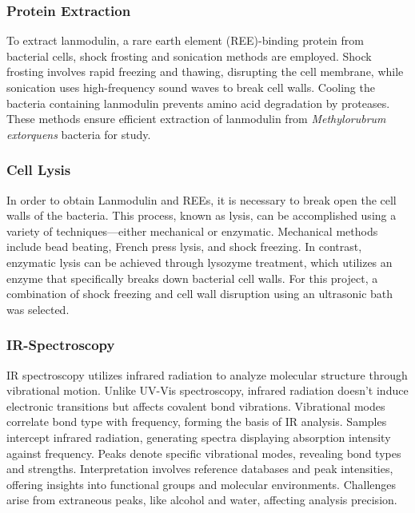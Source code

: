 \subsubsection{Protein Extraction\authorB{}}
To extract lanmodulin, a rare earth element (REE)-binding protein from bacterial cells, shock frosting and sonication methods are employed.
Shock frosting involves rapid freezing and thawing, disrupting the cell membrane, while sonication uses high-frequency sound waves to break cell walls.
Cooling the bacteria containing lanmodulin prevents amino acid degradation by proteases.
These methods ensure efficient extraction of lanmodulin from \emph{Methylorubrum extorquens} bacteria for study.

\subsubsection{Cell Lysis\authorB{}}
In order to obtain Lanmodulin and REEs, it is necessary to break open the cell walls of the
bacteria.
This process, known as lysis, can be accomplished using a variety of techniques—either mechanical or enzymatic.
Mechanical methods include bead beating, French press lysis, and shock freezing.
In contrast, enzymatic lysis can be achieved through lysozyme treatment, which utilizes an enzyme that specifically breaks down bacterial cell walls.
For this project, a combination of shock freezing and cell wall disruption using an ultrasonic bath was selected.

\subsubsection{IR-Spectroscopy\authorB}
IR spectroscopy utilizes infrared radiation to analyze molecular structure through vibrational motion.
Unlike UV-Vis spectroscopy, infrared radiation doesn't induce electronic transitions but
affects covalent bond vibrations.
Vibrational modes correlate bond type with frequency, forming the basis of IR analysis.
Samples intercept infrared radiation, generating spectra displaying absorption intensity against frequency.
Peaks denote specific vibrational modes, revealing bond types and strengths.
Interpretation involves reference databases and peak intensities, offering insights into functional groups and molecular environments.
Challenges arise from extraneous peaks, like alcohol and water, affecting analysis precision.

